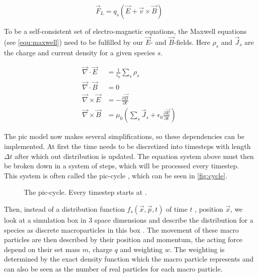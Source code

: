 \documentclass[bachelor_thesis]{subfiles}
\begin{document}
\begin{equation}
	\vec{F}_L=q_s\left(\vec{E}+\vec{v}\times\vec{B}\right)
	\label{equ:lorentz}
\end{equation}

To be a self-consistent set of electro-magnetic equations, the Maxwell equations (see \autoref{equ:maxwell}) need to be fulfilled by our $\vec{E}$- and $\vec{B}$-fields. Here $\rho_s$ and $\vec{J}_s$ are the charge and current density for a given species $s$.

\begin{equation}
\begin{aligned}
	\vec{\nabla}\cdot\vec{E}  &= \frac{1}{\epsilon_0}\sum_s \rho_s 									\\
	\vec{\nabla}\cdot\vec{B}  &= 0 														\\
	\vec{\nabla}\times\vec{E} &= -\frac{\partial \vec{B}}{\partial t}									\\
	\vec{\nabla}\times\vec{B}&= \mu_0 \left(\sum_s \vec{J}_s + \epsilon_0 \frac{\partial \vec{E}}{\partial t}\right)	
\end{aligned}
\label{equ:maxwell}
\end{equation}

The \gls{pic} model now makes several simplifications, so these dependencies can be implemented.
At first the time needs to be discretized into timesteps with length $\Delta t$ after which out distribution is updated. The equation system above must then be broken down in a system of steps, which will be processed every timestep.
This system is often called the \gls{pic}-cycle \cite{Huebl2019}, which can be seen in \autoref{fig:cycle}.

\begin{figure}
	\centering
	\missingfigure{}
	\caption{The \gls{pic}-cycle. Every timestep starts at .}
	\label{fig:cycle}
\end{figure}

Then, instead of a distribution function $f_s(\vec{x}, \vec{p}, t)$ of time $t$ , position $\vec{x}$, we look at a simulation box in 3 space dimensions and describe the distribution for a species as discrete macroparticles in this box \cite{Burau2010}.
The movement of these macro particles are then described by their position and momentum, the acting force depend on their set mass $m$, charge $q$ and weighting $w$.
The weighting is determined by the exact density function which the macro particle represents and can also be seen as the number of real particles for each macro particle.
\end{document}
